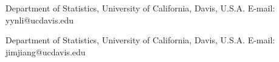\documentclass[12pt]{article} %
\theoremstyle{definition}
\begin{document}
\begin{thebibliography}{}
\end{thebibliography}


\noindent
Department of Statistics, University of California, Davis, U.S.A.
\noindent
E-mail: yynli@ucdavis.edu
\vskip 2pt

\noindent
Department of Statistics, University of California, Davis, U.S.A.
\noindent
E-mail: jimjiang@ucdavis.edu


\end{document}
